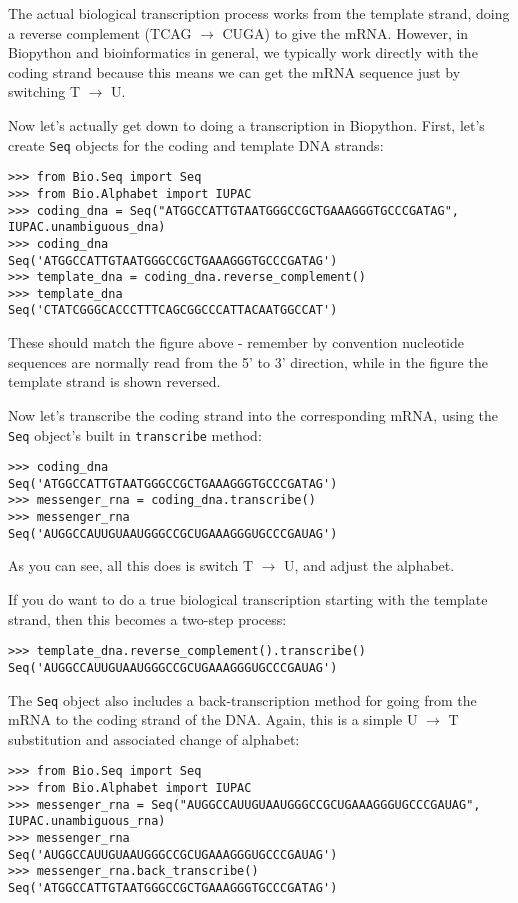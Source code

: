 The actual biological transcription process works from the template strand, doing a reverse complement (TCAG $\rightarrow$ CUGA) to give the mRNA.  However, in Biopython and bioinformatics in general, we typically work directly with the coding strand because this means we can get the mRNA sequence just by switching T $\rightarrow$ U.

Now let's actually get down to doing a transcription in Biopython.  First, let's create \verb|Seq| objects for the coding and template DNA strands:

\begin{verbatim}
>>> from Bio.Seq import Seq
>>> from Bio.Alphabet import IUPAC
>>> coding_dna = Seq("ATGGCCATTGTAATGGGCCGCTGAAAGGGTGCCCGATAG", IUPAC.unambiguous_dna)
>>> coding_dna
Seq('ATGGCCATTGTAATGGGCCGCTGAAAGGGTGCCCGATAG')
>>> template_dna = coding_dna.reverse_complement()
>>> template_dna
Seq('CTATCGGGCACCCTTTCAGCGGCCCATTACAATGGCCAT')
\end{verbatim}
\noindent These should match the figure above - remember by convention nucleotide sequences are normally read from the 5' to 3' direction, while in the figure the template strand is shown reversed.

Now let's transcribe the coding strand into the corresponding mRNA, using the \verb|Seq| object's built in \verb|transcribe| method:

\begin{verbatim}
>>> coding_dna
Seq('ATGGCCATTGTAATGGGCCGCTGAAAGGGTGCCCGATAG')
>>> messenger_rna = coding_dna.transcribe()
>>> messenger_rna
Seq('AUGGCCAUUGUAAUGGGCCGCUGAAAGGGUGCCCGAUAG')
\end{verbatim}
\noindent As you can see, all this does is switch T $\rightarrow$ U, and adjust the alphabet.

If you do want to do a true biological transcription starting with the template strand, then this becomes a two-step process:

\begin{verbatim}
>>> template_dna.reverse_complement().transcribe()
Seq('AUGGCCAUUGUAAUGGGCCGCUGAAAGGGUGCCCGAUAG')
\end{verbatim}

The \verb|Seq| object also includes a back-transcription method for going from the mRNA to the coding strand of the DNA.  Again, this is a simple U $\rightarrow$ T substitution and associated change of alphabet:

\begin{verbatim}
>>> from Bio.Seq import Seq
>>> from Bio.Alphabet import IUPAC
>>> messenger_rna = Seq("AUGGCCAUUGUAAUGGGCCGCUGAAAGGGUGCCCGAUAG", IUPAC.unambiguous_rna)
>>> messenger_rna
Seq('AUGGCCAUUGUAAUGGGCCGCUGAAAGGGUGCCCGAUAG')
>>> messenger_rna.back_transcribe()
Seq('ATGGCCATTGTAATGGGCCGCTGAAAGGGTGCCCGATAG')
\end{verbatim}


